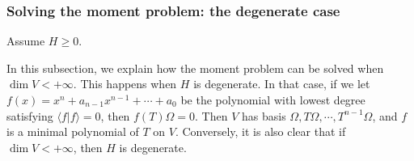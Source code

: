 \documentclass[12pt,b5paper,notitlepage]{article}
\theoremstyle{definition}
\newtheorem{rem}[df]{Remark}
\theoremstyle{plain}
\newcommand{\wtd}{\widetilde}
\newcommand{\ovl}{\overline}
\newcommand{\bk}[1]{\langle {#1}\rangle}
\newcommand{\bigbk}[1]{\big\langle {#1}\big\rangle}
\newcommand{\Cbb}{\mathbb C}
\numberwithin{equation}{section}
\begin{document}
\begin{comment}
\begin{rem}
The triple $(V,\Omega,T)$ satisfying the requirements in Thm. \ref{lb167} are unique up to unitary operators. Namely, if $(\wtd V,\wtd\Omega,\wtd T)$ is another triple satisfying the requirements in Thm. \ref{lb167}, then there is a (necessarily unique) unitary operator $\Phi:V\rightarrow\wtd V$ satisfying $\Phi\Omega=\wtd\Omega$ and $\Phi T=\wtd T\Phi$.
\end{rem}


\begin{proof}
For each $f\in\Cbb[x]$, since $\omega_T$ is Hermitian, we have $\bk{\eta|f(T)\xi}=\bk{\ovl f(T)\eta|\xi}$ for each $\xi,\eta\in V$. A similar property holds for $\wtd T$. Therefore, 
\begin{align*}
\bigbk{f(T)\Omega\big|f(T)\Omega}=\bigbk{\Omega\big||f|^2(T)\Omega}=\bigbk{\wtd\Omega\big||f|^2(\wtd T)\wtd\Omega}=\bigbk{f(\wtd T)\wtd\Omega\big|f(\wtd T)\wtd\Omega}
\end{align*}
In particular, $f(T)\Omega=0$ iff $f(\wtd T)\wtd\Omega=0$. Therefore, by the algebraic cyclicity, we have a unitary map
\begin{align}
\Phi:V\rightarrow\wtd V\qquad f(T)\Omega\mapsto f(\wtd T)\wtd\Omega
\end{align}
This map clearly satisfies the desired property.

Conversely, if $\Phi$ satisfies the requirements in the remark, then $\Phi$ must send $f(T)\Omega$ to $f(\wtd T)\wtd\Omega$. Therefore, such $\Phi$ must be unique. 
\end{proof}
\end{comment}





\subsubsection{Solving the moment problem: the degenerate case}

Assume $H\geq0$.

In this subsection, we explain how the moment problem can be solved when $\dim V<+\infty$. This happens when $H$ is degenerate. In that case, if we let $f(x)=x^n+a_{n-1}x^{n-1}+\cdots+a_0$ be the polynomial with lowest degree satisfying $\bk{f|f}=0$, then $f(T)\Omega=0$. Then $V$ has basis $\Omega,T\Omega,\cdots,T^{n-1}\Omega$, and $f$ is a minimal polynomial of $T$ on $V$. Conversely, it is also clear that if $\dim V<+\infty$, then $H$ is degenerate.
\end{document}
